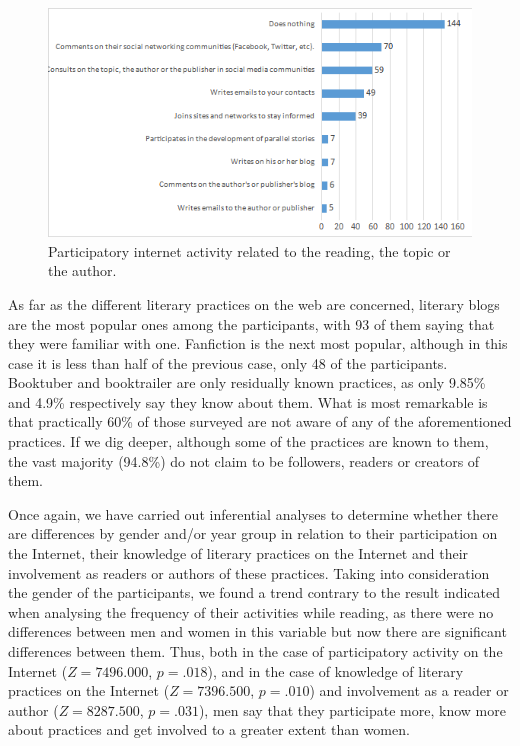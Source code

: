 \documentclass[english]{textolivre}
\begin{document}
\begin{figure}[htbp]
\centering
\begin{minipage}{.85\textwidth}
 \includegraphics[width=\textwidth]{Imagem6.png}
 \caption{Participatory internet activity related to the reading, the topic or the author.}
 \label{fig06}
\end{minipage}
\end{figure}

As far as the different literary practices on the web are concerned, literary blogs are the most popular ones among the participants, with 93 of them saying that they were familiar with one. Fanfiction is the next most popular, although in this case it is less than half of the previous case, only 48 of the participants. Booktuber and booktrailer are only residually known practices, as only 9.85\% and 4.9\% respectively say they know about them. What is most remarkable is that practically 60\% of those surveyed are not aware of any of the aforementioned practices. If we dig deeper, although some of the practices are known to them, the vast majority (94.8\%) do not claim to be followers, readers or creators of them.

Once again, we have carried out inferential analyses to determine whether there are differences by gender and/or year group in relation to their participation on the Internet, their knowledge of literary practices on the Internet and their involvement as readers or authors of these practices. Taking into consideration the gender of the participants, we found a trend contrary to the result indicated when analysing the frequency of their activities while reading, as there were no differences between men and women in this variable but now there are significant differences between them. Thus, both in the case of participatory activity on the Internet ($Z=7496.000$, $p=.018$), and in the case of knowledge of literary practices on the Internet ($Z=7396.500$, $p=.010$) and involvement as a reader or author ($Z=8287.500$, $p=.031$), men say that they participate more, know more about practices and get involved to a greater extent than women.
\end{document}
